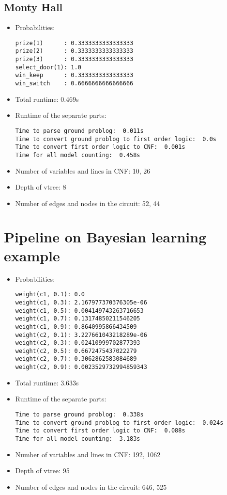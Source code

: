 \subsection{Monty Hall}
\begin{itemize}
    \item Probabilities:
    \begin{lstlisting}
prize(1)      : 0.3333333333333333
prize(2)      : 0.3333333333333333
prize(3)      : 0.3333333333333333
select_door(1): 1.0
win_keep      : 0.3333333333333333
win_switch    : 0.6666666666666666
    \end{lstlisting}
    \item Total runtime: 0.469s
    \item Runtime of the separate parts:
    \begin{lstlisting}
Time to parse ground problog:  0.011s
Time to convert ground problog to first order logic:  0.0s
Time to convert first order logic to CNF:  0.001s
Time for all model counting:  0.458s
    \end{lstlisting}
    \item Number of variables and lines in CNF: 10, 26
    \item Depth of vtree: 8
    \item Number of edges and nodes in the circuit: 52, 44
\end{itemize}

\section{Pipeline on Bayesian learning example}
\begin{itemize}
    \item Probabilities:
    \begin{lstlisting}
weight(c1, 0.1): 0.0
weight(c1, 0.3): 2.167977370376305e-06
weight(c1, 0.5): 0.004149743263716653
weight(c1, 0.7): 0.13174850211546205
weight(c1, 0.9): 0.8640995866434509
weight(c2, 0.1): 3.227661043218289e-06
weight(c2, 0.3): 0.02410999702877393
weight(c2, 0.5): 0.6672475437022279
weight(c2, 0.7): 0.3062862583084689
weight(c2, 0.9): 0.0023529732994859343
    \end{lstlisting}

    \item Total runtime: 3.633s
    \item Runtime of the separate parts:
    \begin{lstlisting}
Time to parse ground problog:  0.338s
Time to convert ground problog to first order logic:  0.024s
Time to convert first order logic to CNF:  0.088s
Time for all model counting:  3.183s
    \end{lstlisting}

    \item Number of variables and lines in CNF: 192, 1062
    \item Depth of vtree: 95
    \item Number of edges and nodes in the circuit: 646, 525
\end{itemize}

